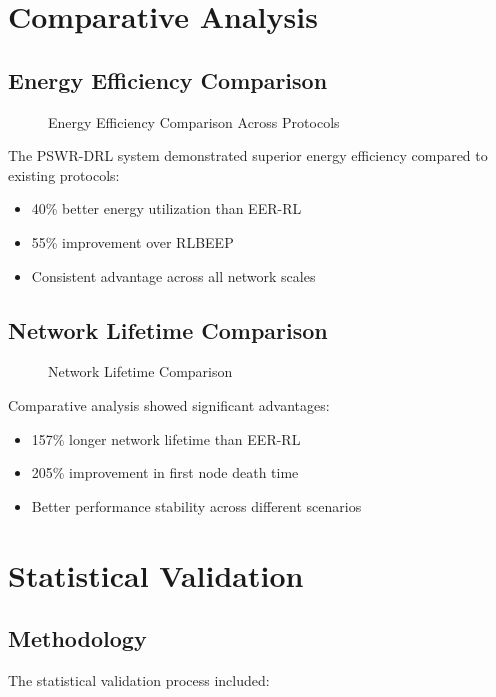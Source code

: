 \section{Comparative Analysis}
\subsection{Energy Efficiency Comparison}

\begin{figure}[h]
\centering
\caption{Energy Efficiency Comparison Across Protocols}
\label{fig:energy_comparison}
\end{figure}

The PSWR-DRL system demonstrated superior energy efficiency compared to existing protocols:

\begin{itemize}
\item 40\% better energy utilization than EER-RL
\item 55\% improvement over RLBEEP
\item Consistent advantage across all network scales
\end{itemize}

\subsection{Network Lifetime Comparison}

\begin{figure}[h]
\centering
\caption{Network Lifetime Comparison}
\label{fig:lifetime_comparison}
\end{figure}

Comparative analysis showed significant advantages:

\begin{itemize}
\item 157\% longer network lifetime than EER-RL
\item 205\% improvement in first node death time
\item Better performance stability across different scenarios
\end{itemize}

\section{Statistical Validation}
\subsection{Methodology}
The statistical validation process included:


